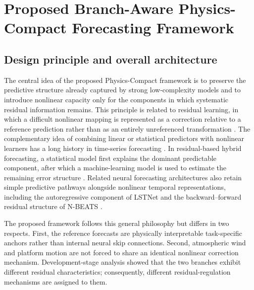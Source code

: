 
\section{Proposed Branch-Aware Physics-Compact Forecasting Framework}
\label{sec:method}

\subsection{Design principle and overall architecture}
\label{subsec:overall_architecture}

The central idea of the proposed Physics-Compact framework is to preserve the predictive structure already captured by strong low-complexity models and to introduce nonlinear capacity only for the components in which systematic residual information remains. This principle is related to residual learning, in which a difficult nonlinear mapping is represented as a correction relative to a reference prediction rather than as an entirely unreferenced transformation \cite{He2016}. The complementary idea of combining linear or statistical predictors with nonlinear learners has a long history in time-series forecasting \cite{Zhang2003,Khashei2011}. In residual-based hybrid forecasting, a statistical model first explains the dominant predictable component, after which a machine-learning model is used to estimate the remaining error structure \cite{SantosJunior2019,SantosJunior2023}. Related neural forecasting architectures also retain simple predictive pathways alongside nonlinear temporal representations, including the autoregressive component of LSTNet \cite{Lai2018} and the backward--forward residual structure of N-BEATS \cite{Oreshkin2020}.

The proposed framework follows this general philosophy but differs in two respects. First, the reference forecasts are physically interpretable task-specific anchors rather than internal neural skip connections. Second, atmospheric wind and platform motion are not forced to share an identical nonlinear correction mechanism. Development-stage analysis showed that the two branches exhibit different residual characteristics; consequently, different residual-regulation mechanisms are assigned to them.

